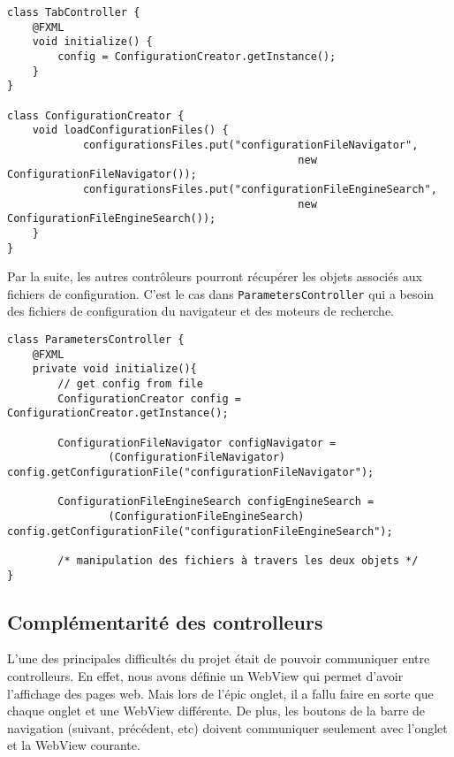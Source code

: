 \documentclass[10pt,a4paper]{article}
\begin{document}
\newpage

\begin{lstlisting}
class TabController {
    @FXML
    void initialize() {
	    config = ConfigurationCreator.getInstance();
    }
}

class ConfigurationCreator {
    void loadConfigurationFiles() {
	    	configurationsFiles.put("configurationFileNavigator", 
		                                      new ConfigurationFileNavigator());
		    configurationsFiles.put("configurationFileEngineSearch", 
		                                      new ConfigurationFileEngineSearch());
	}
}
\end{lstlisting}

Par la suite, les autres contrôleurs pourront récupérer les objets associés aux fichiers de configuration. C'est le cas dans \verb|ParametersController| qui a besoin des fichiers de configuration du navigateur et des moteurs de recherche.

\begin{lstlisting}
class ParametersController {
    @FXML
    private void initialize(){
        // get config from file
        ConfigurationCreator config = ConfigurationCreator.getInstance();

        ConfigurationFileNavigator configNavigator = 
        		(ConfigurationFileNavigator) config.getConfigurationFile("configurationFileNavigator");
        
        ConfigurationFileEngineSearch configEngineSearch =
        		(ConfigurationFileEngineSearch) config.getConfigurationFile("configurationFileEngineSearch");
        		
        /* manipulation des fichiers à travers les deux objets */
}
\end{lstlisting}  

\newpage

\subsection{Complémentarité des controlleurs}
L'une des principales difficultés du projet était de pouvoir communiquer entre controlleurs. En effet, nous avons définie un WebView qui permet d'avoir l'affichage des pages web. Mais lors de l'épic onglet, il a fallu faire en sorte que chaque onglet et une WebView différente. De plus, les boutons de la barre de navigation (suivant, précédent, etc) doivent communiquer seulement avec l'onglet et la WebView courante. \\
\end{document}
